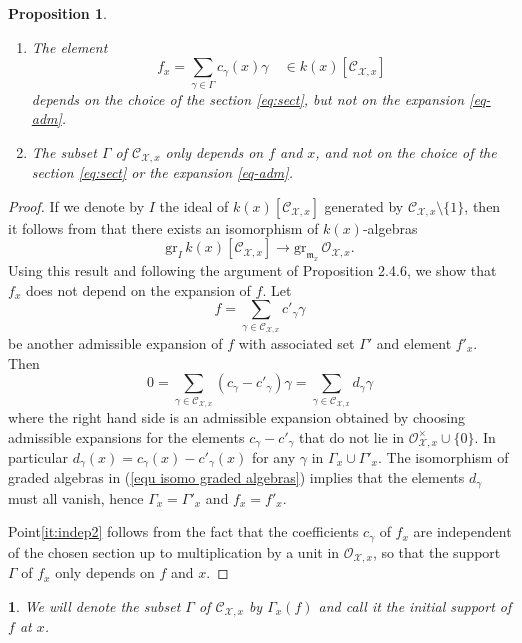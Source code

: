 \documentclass{amsart}%
\numberwithin{equation}{subsection}
\theoremstyle{plain2}
\newtheorem{prop}[equation]{Proposition}
\theoremstyle{definition2}
\theoremstyle{stepstyle}
\theoremstyle{point}
\theoremstyle{subpoint}
\newtheorem{subpoint}[equation]{}%
\newcommand{\spa}[1]{\begin{subpoint}#1\end{subpoint}}           %
\newcommand{\cX}{\ensuremath{\mathscr{X}}}
\newcommand{\caO}{\ensuremath{\mathcal{O}}}
\begin{document}
\begin{prop}\label{prop-init}\item
\begin{enumerate}
\item \label{it:indep1} The element
$$f_x=\sum_{\gamma\in \Gamma}c_\gamma(x) \gamma\quad \in k(x)[\mathcal{C}_{\cX,x}]$$ depends on the choice of the section
\eqref{eq:sect}, but not on the expansion \eqref{eq-adm}. \item
\label{it:indep2} The subset $\Gamma$ of $\mathcal{C}_{\cX,x}$
only depends on $f$ and $x$, and not on the choice of the section
\eqref{eq:sect} or the expansion \eqref{eq-adm}.
\end{enumerate}
\end{prop}
\begin{proof}
If we denote by $I$ the ideal of $k(x)[\mathcal{C}_{\cX,x}]$ generated by $\mathcal{C}_{\cX,x}\setminus \{1\}$, then it follows from \cite{Kato1994a} that there exists an isomorphism of $k(x)$-algebras \begin{equation} \label{equ isomo graded algebras}
\mathrm{gr}_I \,k(x)[\mathcal{C}_{\cX,x}]\to \mathrm{gr}_{\mathfrak{m}_x}\, \mathcal{O}_{\cX,x}.
\end{equation}
Using this result and following the argument of  \cite{MustataNicaise} Proposition 2.4.6, we show that $f_x$ does not depend on the expansion of $f$. Let $$f=\sum_{\gamma \in \mathcal{C}_{\cX,x}}c'_{\gamma}\gamma$$ be another admissible expansion of $f$ with associated set $\Gamma'$ and element $f'_x$. Then $$0=\sum_{\gamma \in \mathcal{C}_{\cX,x}}(c_{\gamma}- c'_\gamma)\gamma =\sum_{\gamma \in \mathcal{C}_{\cX,x}}d_{\gamma}\gamma$$ where the right hand side is an admissible expansion obtained by choosing admissible expansions for the elements $c_\gamma-c'_\gamma$ that do not lie in $\caO_{\cX,x}^\times \cup \{0\}$. In particular $d_\gamma(x)= c_\gamma(x)-c'_\gamma(x)$ for any $\gamma$ in $ \Gamma_x \cup \Gamma'_x$. The isomorphism of graded algebras in (\ref{equ isomo graded algebras}) implies that the elements $d_\gamma$ must all vanish, hence $\Gamma_x = \Gamma'_x$ and $f_x=f'_x$.  

Point\eqref{it:indep2} follows from the fact that the coefficients $c_\gamma$ of $f_x$ are independent of the chosen section up to multiplication by a unit in $\mathcal{O}_{\cX,x}$, so that the support $\Gamma$ of $f_x$ only depends on $f$ and $x$.
\end{proof}

\spa{ We will denote the subset $\Gamma$ of $\mathcal{C}_{\cX,x}$
by $\Gamma_x(f)$ and call it the {\em initial support} of $f$ at
$x$.}
\end{document}
